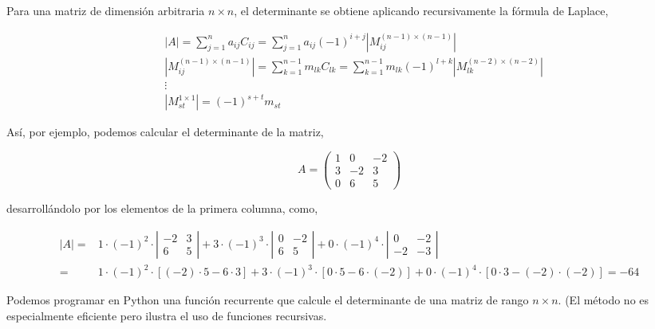 \begin{paracol}{2}
Para una matriz de dimensión arbitraria $n\times n$, el determinante se obtiene aplicando recursivamente la fórmula de Laplace,
\end{paracol}

\begin{align*}
&\vert A  \vert = \sum_{j=1}^na_{ij}C_{ij} =\sum_{j=1}^na_{ij}(-1)^{i+j} \left \vert M_{ij}^{(n-1)\times(n-1)} \right \vert \\
&\left \vert M_{ij}^{(n-1)\times(n-1)} \right \vert = \sum_{k=1}^{n-1}m_{lk}C_{lk} =\sum_{k=1}^{n-1}m_{lk}(-1)^{l+k} \left \vert M_{lk}^{(n-2)\times (n-2)} \right \vert\\
&\vdots \\
&\left \vert M_{st}^{1\times 1}\right \vert=(-1)^{s+t}m_{st} 
\end{align*}
\begin{paracol}{2}
Así, por ejemplo, podemos calcular el determinante de la matriz,
\end{paracol}
\begin{equation*}
A=\begin{pmatrix}
1& 0& -2\\
3& -2& 3\\
0& 6& 5
\end{pmatrix}
\end{equation*}
\begin{paracol}{2}
desarrollándolo por los elementos de la primera columna, como,
\end{paracol}
\begin{align*}
\left\vert A \right\vert =& 1\cdot (-1)^2\cdot 
\left\vert \begin{matrix}
-2& 3\\ 
6& 5
\end{matrix} \right\vert + 3\cdot (-1)^3\cdot
\left\vert \begin{matrix}
0& -2\\ 
6& 5
\end{matrix} \right\vert+ 0\cdot (-1)^4 \cdot 
\left\vert \begin{matrix}
0& -2\\ 
-2& -3
\end{matrix} \right\vert \\
=& 1\cdot (-1)^2\cdot \left[ (-2)\cdot 5 - 6\cdot 3 \right] +3\cdot (-1)^3\cdot  \left[ 0\cdot 5 - 6\cdot (-2)\right] + 0\cdot (-1)^4 \cdot \left[ 0\cdot 3 - (-2)\cdot (-2)\right]= -64
\end{align*}

Podemos programar en Python una función recurrente que calcule el determinante de una matriz de rango $n\times n$. (El método no es especialmente eficiente pero ilustra el uso de funciones recursivas.

